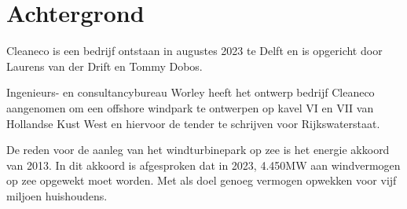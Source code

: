 \section{Achtergrond}
Cleaneco is een bedrijf ontstaan in augustes 2023 te Delft en is opgericht door Laurens van der Drift en Tommy Dobos.

Ingenieurs- en consultancybureau Worley heeft het ontwerp bedrijf Cleaneco aangenomen om een \gls{offshore} windpark te ontwerpen op kavel VI en VII van Hollandse Kust West en hiervoor de \gls{tender} te schrijven voor Rijkswaterstaat. 

De reden voor de aanleg van het windturbinepark op zee is het \gls{energie akkoord}\cite{energieakkoord} van 2013. In dit akkoord is afgesproken dat in 2023, 4.450MW aan windvermogen op zee opgewekt moet worden. Met als doel genoeg vermogen opwekken voor vijf miljoen huishoudens. 
